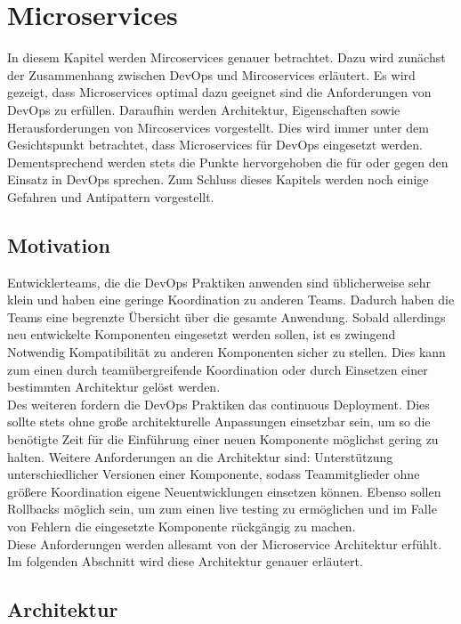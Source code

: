 \chapter{Microservices}
In diesem Kapitel werden Mircoservices genauer betrachtet. Dazu wird zunächst der Zusammenhang zwischen DevOps und Mircoservices erläutert. Es wird gezeigt, dass Microservices optimal dazu geeignet sind die Anforderungen von DevOps zu erfüllen.   Daraufhin werden Architektur, Eigenschaften sowie Herausforderungen von Mircoservices vorgestellt. Dies wird immer unter dem Gesichtspunkt betrachtet, dass Microservices für DevOps eingesetzt werden. Dementsprechend werden stets die Punkte hervorgehoben die für oder gegen den Einsatz in DevOps sprechen. Zum Schluss dieses Kapitels werden noch einige Gefahren und Antipattern vorgestellt.

\section{Motivation}

Entwicklerteams, die die DevOps Praktiken anwenden sind üblicherweise sehr klein und haben eine geringe Koordination zu anderen Teams. Dadurch haben die Teams eine begrenzte Übersicht über die gesamte Anwendung. Sobald allerdings neu entwickelte Komponenten eingesetzt werden sollen, ist es zwingend Notwendig Kompatibilität zu anderen Komponenten sicher zu stellen. Dies kann zum einen durch teamübergreifende Koordination oder durch Einsetzen einer bestimmten Architektur gelöst werden.     \\
Des weiteren fordern die DevOps Praktiken das continuous Deployment. Dies sollte stets ohne große architekturelle Anpassungen einsetzbar sein, um so die benötigte Zeit für die Einführung einer neuen Komponente möglichst gering zu halten. Weitere Anforderungen an die Architektur sind: Unterstützung unterschiedlicher Versionen einer Komponente, sodass Teammitglieder ohne größere Koordination eigene Neuentwicklungen einsetzen können. Ebenso sollen Rollbacks möglich sein, um zum einen live testing zu ermöglichen und im Falle von Fehlern die eingesetzte Komponente rückgängig zu machen.\\

Diese Anforderungen werden allesamt von der Microservice Architektur erfühlt. Im folgenden Abschnitt wird diese Architektur genauer erläutert. 
 


\section{Architektur}

